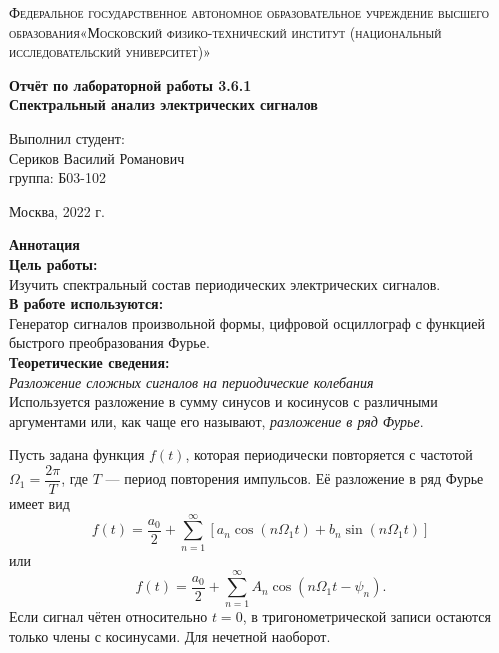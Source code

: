 \documentclass[a4paper, 12pt]{article}%
\begin{document}
	\begin{titlepage}
		\begin{center}
			\textsc{Федеральное государственное автономное образовательное учреждение высшего образования«Московский физико-технический институт (национальный исследовательский университет)»\\[5mm]
			}
			
			\vfill
			
			\textbf{Отчёт по лабораторной работы 3.6.1\\[3mm]
				Спектральный анализ электрических сигналов
				\\[50mm]
			}
			
		\end{center}
		
		\hfill
		\begin{minipage}{.5\textwidth}
			Выполнил студент:\\[2mm]
			Сериков Василий Романович\\[2mm]
			группа: Б03-102\\[5mm]
			
		\end{minipage}
		\vfill
		\begin{center}
			Москва, 2022 г.
		\end{center}
		
	\end{titlepage}
	
	\newpage
	\textbf{Аннотация}\\
	
	
	\textbf{Цель работы: }\\
	Изучить спектральный состав периодических электрических сигналов.\\
	
	
	\textbf{В работе используются: }\\
	Генератор сигналов произвольной формы, цифровой осциллограф с функцией быстрого преобразования Фурье.\\
	
	\textbf{Теоретические сведения: } \\
	
	\textit{Разложение сложных сигналов на периодические колебания}\\
	
	Используется разложение в сумму синусов и косинусов с различными аргументами или, как чаще его называют, \textit{разложение в ряд Фурье}.
	
	Пусть задана функция $f(t)$, которая периодически повторяется с частотой $\Omega_1 = \dfrac{2\pi}{T}$, где $T$ --- период повторения импульсов. Её разложение в ряд Фурье имеет вид 
	\begin{equation}
		f(t) = \dfrac{a_0}{2} + \sum\limits_{n = 1}^{\infty}\left[a_n \cos \left(n \Omega_1t\right) + b_n \sin \left(n \Omega_1t\right)\right]
	\end{equation}
	или
	\begin{equation}
		f(t) = \dfrac{a_0}{2} + \sum\limits_{n = 1}^{\infty}A_n \cos \left(n\Omega_1t-\psi_n\right).
	\end{equation}
	Если сигнал чётен относительно $t=0$, в тригонометрической записи остаются только члены с косинусами. Для нечетной наоборот.
	
\end{document}
